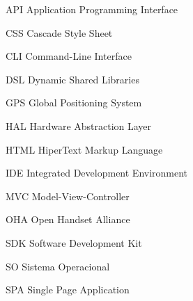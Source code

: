 \begin{siglas}
  
  \item[API] Application Programming Interface
  \item[CSS] Cascade Style Sheet
  \item[CLI] Command-Line Interface
  \item[DSL] Dynamic Shared Libraries
  \item[GPS] Global Positioning System
  \item[HAL] Hardware Abstraction Layer
  \item[HTML] HiperText Markup Language
  \item[IDE] Integrated Development Environment
  \item[MVC] Model-View-Controller
  \item[OHA] Open Handset Alliance
  \item[SDK] Software Development Kit
  \item[SO] Sistema Operacional
  \item[SPA] Single Page Application
    
\end{siglas}
